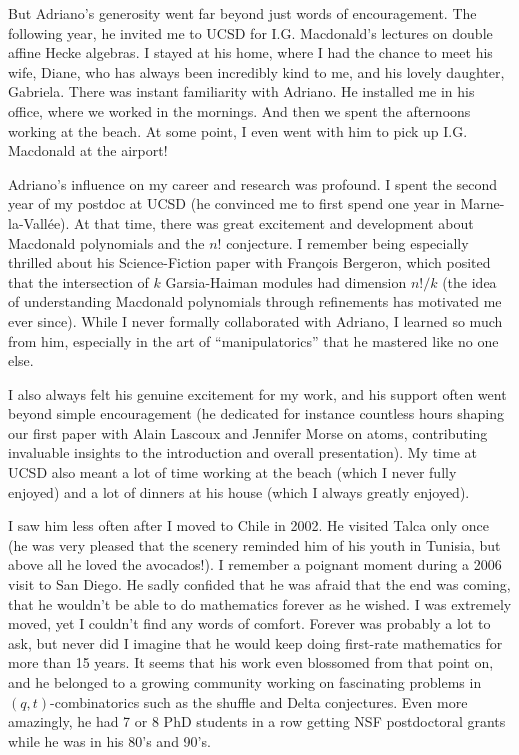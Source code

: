 \documentclass{notices}
\begin{document}
But Adriano's generosity went far beyond just words of encouragement. The following year, he invited me to UCSD for I.G. Macdonald's lectures on double affine Hecke algebras. I stayed at his home, where I had the chance to meet his wife, Diane, who has always been incredibly kind to me, and his lovely daughter, Gabriela.  There was instant familiarity with Adriano.  He installed me in his office, where we worked in the mornings. And then we spent the afternoons working at the beach.  At some point, I even went with him to pick up I.G. Macdonald at the airport!  

Adriano's influence on my career and research was profound. I spent the second year of my postdoc at UCSD (he convinced me to first spend one year in Marne-la-Vallée). At that time, there was great excitement and development about Macdonald polynomials and  the $n!$ conjecture. I remember being especially thrilled about his Science-Fiction paper with Fran\c{c}ois Bergeron, which posited that the intersection of $k$ Garsia-Haiman modules had dimension $n!/k$ (the idea of understanding Macdonald polynomials through refinements has motivated me ever since). While I never formally collaborated with Adriano, I learned so much from him, especially in the art of ``manipulatorics'' that he mastered like no one else. 

I also always felt his genuine excitement for my work, and  his support often went beyond simple encouragement (he dedicated for instance countless hours shaping our first paper with Alain Lascoux and Jennifer Morse on atoms, contributing invaluable insights to the introduction and overall presentation). My time at UCSD also meant a lot of time working at the beach (which I never fully enjoyed) and a lot of dinners at his house (which I always greatly enjoyed).

I saw him less often after I moved to Chile in 2002.  He visited Talca only once (he was very pleased that the scenery reminded him of his youth in Tunisia, but above all he loved the avocados!). I remember a poignant moment during a 2006 visit to San Diego. He sadly confided that he was afraid that the end was coming, that he wouldn't be able to do mathematics forever as he wished. I was extremely moved, yet I couldn't find any words of comfort. Forever was probably a lot to ask, but never did I imagine that he would keep doing first-rate mathematics for more than 15 years.  It seems that his work  even blossomed from that point on, and he belonged to a growing community working on fascinating problems in $(q,t)$-combinatorics such as the shuffle and Delta conjectures. Even more amazingly, he had 7 or 8 PhD students in a row getting NSF postdoctoral grants while he was in his 80's and 90's.
\end{document}
